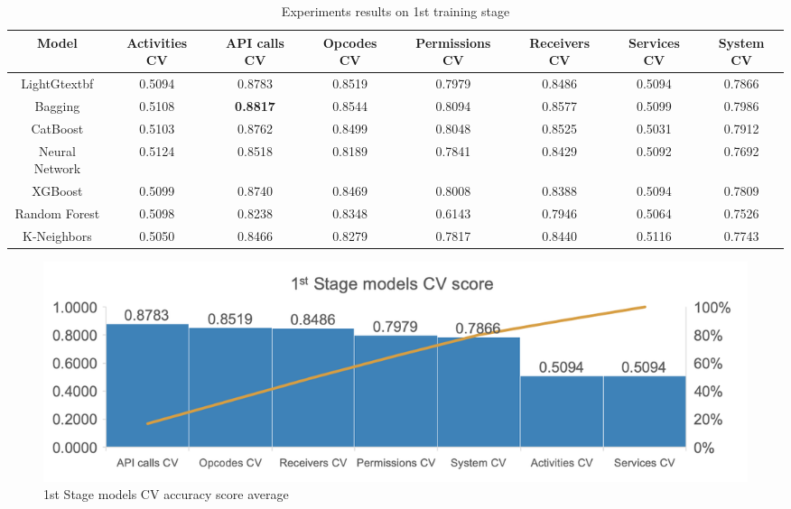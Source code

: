 \begin{table}[htbp]
    \centering
    \caption{Experiments results on 1st training stage}
    \label{table:1ststage}
    \begin{adjustbox}{width=\textwidth}
        
    \begin{tabular}{|cccccccc|}
        \hline
        
        \textbf{Model} & \textbf{Activities CV} & \textbf{API calls CV} & \textbf{Opcodes CV} & \textbf{Permissions CV} & \textbf{Receivers CV} & \textbf{Services CV} & \textbf{System CV} \\ \hline
        LightGtextbf & 0.5094 & 0.8783 & 0.8519 & 0.7979 & 0.8486 & 0.5094 & 0.7866 \\ \hline
        Bagging & 0.5108 & \textbf{0.8817} & 0.8544 & 0.8094 & 0.8577 & 0.5099 & 0.7986 \\ \hline
        CatBoost & 0.5103 & 0.8762 & 0.8499 & 0.8048 & 0.8525 & 0.5031 & 0.7912 \\ \hline
        Neural Network & 0.5124 & 0.8518 & 0.8189 & 0.7841 & 0.8429 & 0.5092 & 0.7692 \\ \hline
        XGBoost & 0.5099 & 0.8740 & 0.8469 & 0.8008 & 0.8388 & 0.5094 & 0.7809 \\ \hline
        Random Forest & 0.5098 & 0.8238 & 0.8348 & 0.6143 & 0.7946 & 0.5064 & 0.7526 \\ \hline
        K-Neighbors & 0.5050 & 0.8466 & 0.8279 & 0.7817 & 0.8440 & 0.5116 & 0.7743 \\ \hline
        
        \end{tabular}

    \end{adjustbox}
    \end{table}

    \begin{figure}[htbp]
        \centering
        \includegraphics[width=\textwidth]{./Figure/1ststage.png}
        \caption{1st Stage models CV accuracy score average}
        \label{fig:1ststage}
      \end{figure}

